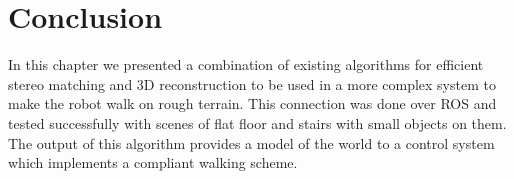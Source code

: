 
\section{Conclusion}

In this chapter we presented a combination of existing algorithms for efficient stereo matching and 3D reconstruction to be used in a more complex system to make the robot walk on rough terrain. This connection was done over ROS and tested successfully with scenes of flat floor and stairs with small objects on them. The output of this algorithm provides a model of the world to a control system which implements a compliant walking scheme.
